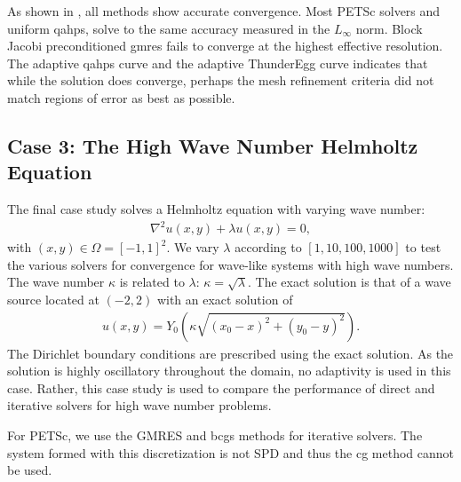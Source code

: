 As shown in , all methods show accurate convergence. Most PETSc solvers and uniform \gls{qahps}, solve to the same accuracy measured in the $L_{\infty}$ norm. Block Jacobi preconditioned \gls{gmres} fails to converge at the highest effective resolution. The adaptive \gls{qahps} curve and the adaptive ThunderEgg curve indicates that while the solution does converge, perhaps the mesh refinement criteria did not match regions of error as best as possible.

\subsection{Case 3: The High Wave Number Helmholtz Equation}
\label{sub:case3}

The final case study solves a Helmholtz equation with varying wave number:
\begin{align}
    \nabla^2 u(x,y) + \lambda u(x,y) = 0,
\end{align}
with $(x,y) \in \Omega = [-1, 1]^2$. We vary $\lambda$ according to $[1, 10, 100, 1000]$ to test the various solvers for convergence for wave-like systems with high wave numbers. The wave number $\kappa$ is related to $\lambda$: $\kappa = \sqrt{\lambda}$. The exact solution is that of a wave source located at $(-2, 2)$ with an exact solution of
\begin{align}
    u(x,y) = Y_0(\kappa \sqrt{(x_0 - x)^2 + (y_0 - y)^2}).
\end{align}
The Dirichlet boundary conditions are prescribed using the exact solution. As the solution is highly oscillatory throughout the domain, no adaptivity is used in this case. Rather, this case study is used to compare the performance of direct and iterative solvers for high wave number problems.

For PETSc, we use the GMRES and \gls{bcgs} methods for iterative solvers. The system formed with this discretization is not SPD and thus the \gls{cg} method cannot be used.

